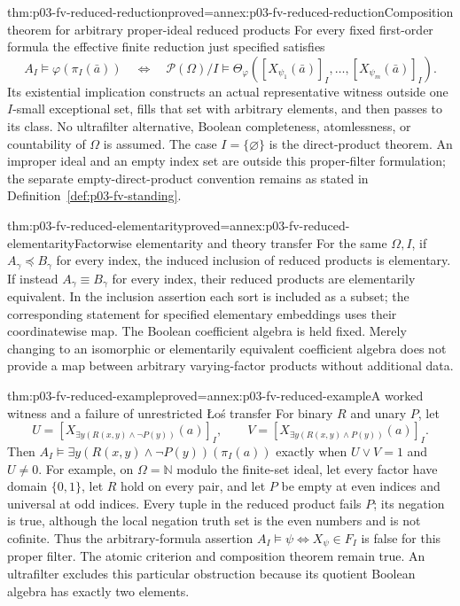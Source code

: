 \begin{hbtheorem}{thm:p03-fv-reduced-reduction}{proved=annex:p03-fv-reduced-reduction}{Composition theorem for arbitrary proper-ideal reduced products}
For every fixed first-order formula the effective finite reduction just
specified satisfies
\[
 A_I\models\varphi(\pi_I(\bar a))
 \quad\Longleftrightarrow\quad
 \mathcal P(\Omega)/I\models
 \Theta_\varphi([X_{\psi_1}(\bar a)]_I,\ldots,
                           [X_{\psi_m}(\bar a)]_I).
\]
Its existential implication constructs an actual representative witness
outside one \(I\)-small exceptional set, fills that set with arbitrary
elements, and then passes to its class. No ultrafilter alternative, Boolean
completeness, atomlessness, or countability of \(\Omega\) is assumed.
The case \(I=\{\varnothing\}\) is the direct-product theorem.
An improper ideal and an empty index set are outside this proper-filter
formulation; the separate empty-direct-product convention remains as stated
in Definition~\ref{def:p03-fv-standing}.
\end{hbtheorem}

\begin{hbcorollary}{thm:p03-fv-reduced-elementarity}{proved=annex:p03-fv-reduced-elementarity}{Factorwise elementarity and theory transfer}
For the same \(\Omega,I\), if \(A_\gamma\preccurlyeq B_\gamma\)
for every index, the induced inclusion of reduced products is elementary.
If instead \(A_\gamma\equiv B_\gamma\) for every index, their reduced
products are elementarily equivalent. In the inclusion assertion each sort
is included as a subset; the corresponding statement for specified elementary
embeddings uses their coordinatewise map. The Boolean coefficient algebra
is held fixed. Merely changing to an isomorphic or elementarily equivalent
coefficient algebra does not provide a map between arbitrary varying-factor
products without additional data.
\end{hbcorollary}

\begin{hbtheorem}{thm:p03-fv-reduced-example}{proved=annex:p03-fv-reduced-example}{A worked witness and a failure of unrestricted \L o\'s transfer}
For binary \(R\) and unary \(P\), let
\[
 U=[X_{\exists y(R(x,y)\land\neg P(y))}(a)]_I,
 \qquad V=[X_{\exists y(R(x,y)\land P(y))}(a)]_I.
\]
Then \(A_I\models\exists y(R(x,y)\land\neg P(y))(\pi_I(a))\)
exactly when \(U\vee V=1\) and \(U\ne0\).
For example, on \(\Omega=\mathbb N\) modulo the finite-set ideal,
let every factor have domain \(\{0,1\}\), let \(R\) hold on every pair,
and let \(P\) be empty at even indices and universal at odd indices.
Every tuple in the reduced product fails \(P\); its negation is true,
although the local negation truth set is the even numbers and is not
cofinite. Thus the arbitrary-formula assertion
\(A_I\models\psi\Longleftrightarrow X_\psi\in F_I\) is false
for this proper filter. The atomic criterion and composition theorem
remain true. An ultrafilter excludes this particular obstruction because
its quotient Boolean algebra has exactly two elements.
\end{hbtheorem}

